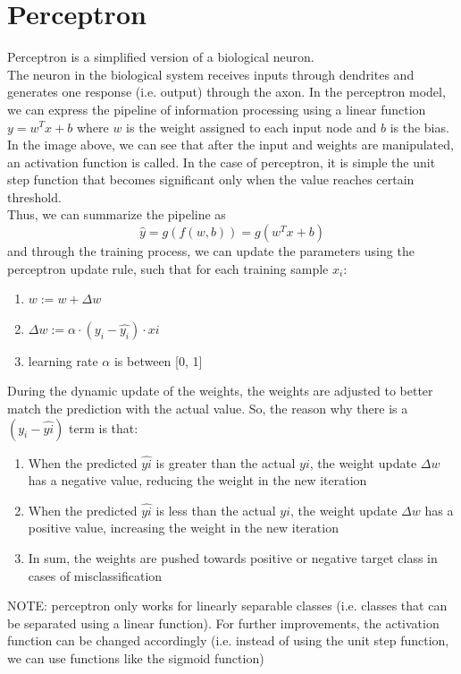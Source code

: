 \documentclass[12pt]{article}
\begin{document}
\section{Perceptron}
Perceptron is a simplified version of a biological neuron.\\
The neuron in the biological system receives inputs through dendrites and generates one response (i.e. output) through the axon. In the perceptron model, we can express the pipeline of information processing using a linear function $y = w^Tx + b$ where $w$ is the weight assigned to each input node and $b$ is the bias. In the image above, we can see that after the input and weights are manipulated, an activation function is called. In the case of perceptron, it is simple the unit step function that becomes significant only when the value reaches certain threshold.\\
Thus, we can summarize the pipeline as $$\hat{y} = g(f(w, b)) = g(w^Tx + b)$$ and through the training process, we can update the parameters using the perceptron update rule, such that for each training sample $x_i$:
\begin{enumerate}
	\item $w := w + \Delta w$
	\item $\Delta w := \alpha \cdot (y_i - \hat{y_i})\cdot x  i$
	\item learning rate $\alpha$ is between [0, 1]
\end{enumerate}
During the dynamic update of the weights, the weights are adjusted to better match the prediction with the actual value. So, the reason why there is a $(y_i - \hat{y  i})$ term is that:
\begin{enumerate}
	\item When the predicted $\hat{y  i}$ is greater than the actual $y  i$, the weight update $\Delta w$ has a negative value, reducing the weight in the new iteration
	\item When the predicted $\hat{y  i}$ is less than the actual $y  i$, the weight update $\Delta w$ has a positive value, increasing the weight in the new iteration
	\item In sum, the weights are pushed towards positive or negative target class in cases of misclassification  
\end{enumerate}
NOTE: perceptron only works for linearly separable classes (i.e. classes that can be separated using a linear function). For further improvements, the activation function can be changed accordingly (i.e. instead of using the unit step function, we can use functions like the sigmoid function)
\newpage
\end{document}
